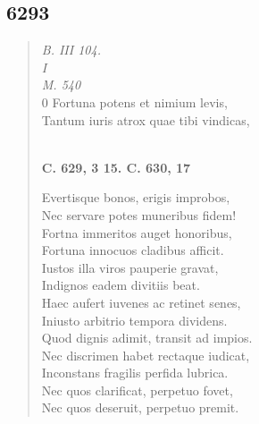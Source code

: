 \documentclass[11pt, a4paper]{report}
\begin{document}
            \subsection*{6293}
      \begin{verse}
      \textit{B. III 104.} \\ \textit{I} \\ \textit{M. 540} \\ 0 Fortuna potens et nimium levis, \\ Tantum iuris atrox quae tibi vindicas, \\ 
        ﻿\pagebreak 
    \begin{center} \textbf{C. 629, 3 15. C. 630, 17} \end{center} \marginpar{[97]} Evertisque bonos, erigis improbos, \\ Nec servare potes muneribus fidem! \\ Fortna immeritos auget honoribus, \\ Fortuna innocuos cladibus afficit. \\ Iustos illa viros pauperie gravat, \\ Indignos eadem divitiis beat. \\ Haec aufert iuvenes ac retinet senes, \\ Iniusto arbitrio tempora dividens. \\ Quod dignis adimit, transit ad impios. \\ Nec discrimen habet rectaque iudicat, \\ Inconstans fragilis perfida lubrica. \\ Nec quos clarificat, perpetuo fovet, \\ Nec quos deseruit, perpetuo premit. \\ 
      \end{verse}
  
\end{document}
